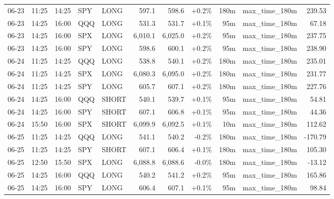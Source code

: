 \documentclass[11pt,a4paper,twoside]{article}
\begin{document}
\begin{center}
\begin{longtable}{>{\color{txtmain}}l l l l l r r r r >{\color{txtmain}}l r}
06-23 & 11:25 & 14:25 & SPY & LONG & 597.1 & 598.6 & \textcolor{wingreen}{+0.2\%} & 180m & max\_time\_180m & \textcolor{wingreen}{239.53} \\
06-23 & 14:25 & 16:00 & QQQ & LONG & 531.3 & 531.7 & \textcolor{wingreen}{+0.1\%} & 95m & max\_time\_180m & \textcolor{wingreen}{67.18} \\
06-23 & 14:25 & 16:00 & SPX & LONG & 6,010.1 & 6,025.0 & \textcolor{wingreen}{+0.2\%} & 95m & max\_time\_180m & \textcolor{wingreen}{237.75} \\
06-23 & 14:25 & 16:00 & SPY & LONG & 598.6 & 600.1 & \textcolor{wingreen}{+0.2\%} & 95m & max\_time\_180m & \textcolor{wingreen}{238.90} \\
06-24 & 11:25 & 14:25 & QQQ & LONG & 538.8 & 540.1 & \textcolor{wingreen}{+0.2\%} & 180m & max\_time\_180m & \textcolor{wingreen}{235.01} \\
06-24 & 11:25 & 14:25 & SPX & LONG & 6,080.3 & 6,095.0 & \textcolor{wingreen}{+0.2\%} & 180m & max\_time\_180m & \textcolor{wingreen}{231.77} \\
06-24 & 11:25 & 14:25 & SPY & LONG & 605.7 & 607.1 & \textcolor{wingreen}{+0.2\%} & 180m & max\_time\_180m & \textcolor{wingreen}{227.76} \\
06-24 & 14:25 & 16:00 & QQQ & SHORT & 540.1 & 539.7 & \textcolor{wingreen}{+0.1\%} & 95m & max\_time\_180m & \textcolor{wingreen}{54.81} \\
06-24 & 14:25 & 16:00 & SPY & SHORT & 607.1 & 606.8 & \textcolor{wingreen}{+0.1\%} & 95m & max\_time\_180m & \textcolor{wingreen}{44.36} \\
06-24 & 15:50 & 16:00 & SPX & SHORT & 6,099.9 & 6,092.5 & \textcolor{wingreen}{+0.1\%} & 10m & max\_time\_180m & \textcolor{wingreen}{112.62} \\
06-25 & 11:25 & 14:25 & QQQ & LONG & 541.1 & 540.2 & \textcolor{lossred}{-0.2\%} & 180m & max\_time\_180m & \textcolor{lossred}{-170.79} \\
06-25 & 11:25 & 14:25 & SPY & SHORT & 607.1 & 606.4 & \textcolor{wingreen}{+0.1\%} & 180m & max\_time\_180m & \textcolor{wingreen}{105.30} \\
06-25 & 12:50 & 15:50 & SPX & LONG & 6,088.8 & 6,088.6 & \textcolor{lossred}{-0.0\%} & 180m & max\_time\_180m & \textcolor{lossred}{-13.12} \\
06-25 & 14:25 & 16:00 & QQQ & LONG & 540.2 & 541.2 & \textcolor{wingreen}{+0.2\%} & 95m & max\_time\_180m & \textcolor{wingreen}{165.86} \\
06-25 & 14:25 & 16:00 & SPY & LONG & 606.4 & 607.1 & \textcolor{wingreen}{+0.1\%} & 95m & max\_time\_180m & \textcolor{wingreen}{98.84} \\

\end{longtable}
\end{center}
\end{document}
